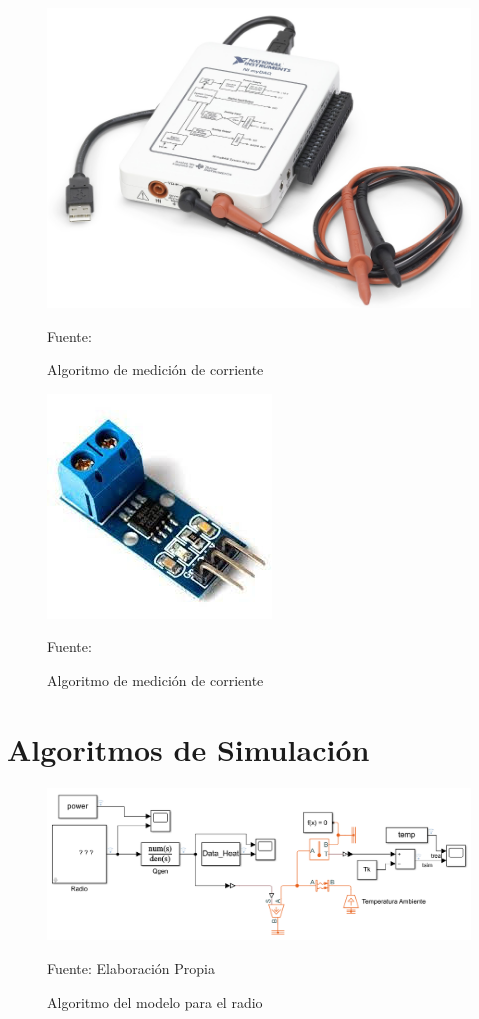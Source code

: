 \vfill

\begin{figure}[H]
\centering
\includegraphics[scale=0.5]{Figuras/daq.png}
\caption{Algoritmo de medición de corriente}

Fuente:\cite{daq}
\label{anexo5}
\end{figure}

\begin{figure}[H]
\centering
\includegraphics[scale=0.9]{Figuras/asc712.jpg}
\caption{Algoritmo de medición de corriente}
Fuente:\cite{asc712}
\label{anexo6}
\end{figure}

\chapter{Algoritmos de Simulación}


\begin{figure}[H]
\centering
\includegraphics[scale=0.5]{Figuras/modelo_radio.png}
\caption{Algoritmo del modelo para el radio}
\centering
Fuente: Elaboración Propia
\label{anexo7}
\end{figure}

